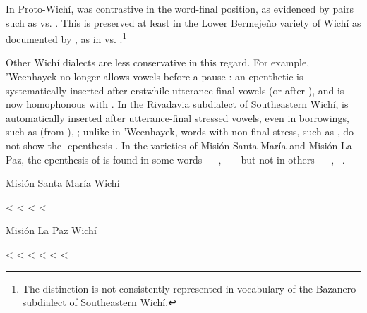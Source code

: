 In Proto-Wichí,  was contrastive in the word-final position, as evidenced by pairs such as  vs. . This is preserved at least in the Lower Bermejeño variety of Wichí as documented by \citet{VN14}, as in  vs.  \citep[212–213]{VN14}.\footnote{The distinction is not consistently represented in  vocabulary of the Bazanero subdialect of Southeastern Wichí.}

Other Wichí dialects are less conservative in this regard. For example, ’Weenhayek no longer allows vowels before a pause \citep[25–26]{KC94}: an epenthetic  is systematically inserted after erstwhile utterance-final vowels (or after ), and  is now homophonous with  \citep[75]{KC16}. In the Rivadavia subdialect of Southeastern Wichí,  is automatically inserted after utterance-final stressed vowels, even in borrowings, such as  (from ), ; unlike in ’Weenhayek, words with non-final stress, such as , do not show the -epenthesis \citep[48–51]{JT09-cap}. In the varieties of Misión Santa María and Misión La Paz, the epenthesis of  is found in some words -- –, – -- but not in others -- –, –.

\newpage
{}
\ea
Misión Santa María Wichí \citep{SS07} \label{wi-msm-findeg}\\
    \begin{xlist}
        \ex {} <  \label{wi-msm-findeg-sleep}
        \ex {} <  \label{wi-msm-findeg-fly}
        \ex {} <  \label{wi-msm-findeg-rat}
        \ex {} <   \label{wi-msm-findeg-girl}
    \end{xlist}
\z
\ea
Misión La Paz Wichí \citep{MA08}\\
    \begin{xlist}
        \ex {} <  \label{wi-mlp-findeg-shoulder}
        \ex {} < 
        \ex {} <  \label{wi-mlp-findeg-rat}
        \ex {} <  \label{wi-mlp-findeg-stone}
        \ex {} < 
        \ex {} <  \label{wi-mlp-findeg-monk}
    \end{xlist}
\z
{}

